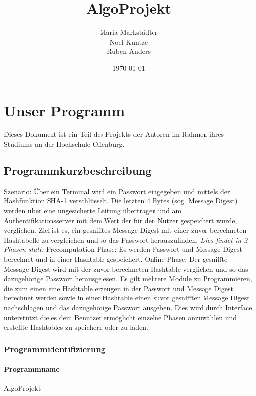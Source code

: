 \documentclass[11pt]{article}
\title{\textbf{AlgoProjekt}}
\author{Maria Markstädter\\
                Noel Kuntze\\
                Ruben Anders\\}
\date{\today}
\begin{document}
 

\maketitle
\newpage
\tableofcontents
\newpage
  \section{Unser Programm}
Dieses Dokument ist ein Teil des Projekts der Autoren im Rahmen ihres Studiums an der Hochschule Offenburg.
  \subsection{Programmkurzbeschreibung}
  Szenario:
Über ein Terminal wird ein Passwort eingegeben und  mittels der Hashfunktion SHA-1 verschlüsselt. Die letzten 4 Bytes (sog. Message Digest) werden über eine ungesicherte Leitung übertragen und am Authentifikationsserver mit dem Wert der für den Nutzer gespeichert wurde, verglichen. \newline 
Ziel ist es, ein gesnifftes Message Digest mit einer zuvor berechneten Hashtabelle zu vergleichen und so das Passwort herauszufinden.\vspace{2px}   \newline 
{\itshape{Dies findet in 2 Phasen statt:}} \vspace{2px}   \newline
Precomputation-Phase: Es werden Passwort und Message Digest berechnet und in einer Hashtable gespeichert.\vspace{2px} \newline 
Online-Phase: Der gesniffte Message Digest wird mit der zuvor berechneten Hashtable verglichen und so das dazugehörige Passwort herausgelesen. 
Es gilt mehrere Module zu Programmieren, die zum einen eine Hashtable erzeugen in der Passwort und Message Digest berechnet werden sowie in einer Hashtable einen zuvor gesnifften Message Digest nachschlagen und das dazugehörige Passwort ausgeben. Dies wird durch Interface unterstützt die es dem Benutzer ermöglicht einzelne Phasen anzuwählen und erstellte Hashtables zu speichern oder zu laden.

   
  \subsubsection{Programmidentifizierung}
  \paragraph{Programmname}
  AlgoProjekt
\end{document}
